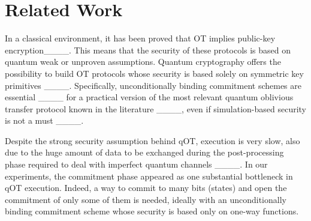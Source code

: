 \section{Related Work}
In a classical environment, it has been proved that OT implies public-key encryption____. 
This means that the security of these protocols is based on quantum weak or unproven assumptions. 
Quantum cryptography offers the possibility to build OT protocols whose security is based solely on symmetric key primitives ____.
Specifically, unconditionally binding commitment schemes are essential ____ for a practical version of the most relevant quantum oblivious transfer protocol known in the literature ____, even if simulation-based security is not a must ____.

Despite the strong security assumption behind qOT, execution is very slow, also due to the huge amount of data to be exchanged during the post-processing phase required to deal with imperfect quantum channels ____.
In our experiments, the commitment phase appeared as one substantial bottleneck in qOT execution.
Indeed, a way to commit to many bits (states) and open the commitment of only some of them is needed, ideally with an unconditionally binding commitment scheme whose security is based only on one-way functions.